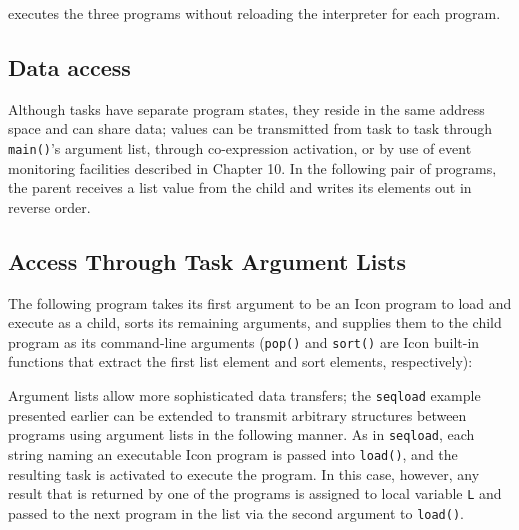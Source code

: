 
\noindent
executes the three programs without reloading the interpreter for each
program. 

\subsection*{Data access}

Although tasks have separate program states, they reside in the same
address space and can share data; values can be transmitted from task
to task through {\texttt{main()}}'s argument list, through
co-expression activation, or by use of event monitoring facilities
described in Chapter 10. In the following pair of programs, the
parent receives a list value from the child and writes its elements
out in reverse order.



\subsection*{Access Through Task Argument Lists}

The following program takes its first argument to be an Icon program
to load and execute as a child, sorts its remaining arguments, and
supplies them to the child program as its command-line arguments
({\tt pop()} and {\tt sort()} are Icon built-in functions that extract
the first list element and sort elements, respectively):


Argument lists allow more sophisticated data transfers; the {\tt seqload} 
example presented earlier can be extended to transmit arbitrary
structures between programs using argument lists in the following
manner.  As in {\tt seqload}, each string naming an executable Icon
program is passed into {\tt load()}, and the resulting task is
activated to execute the program.  In this case, however, any result
that is returned by one of the programs is assigned to local variable
{\tt L} and passed to the next program in the list via the second
argument to {\tt load()}.


